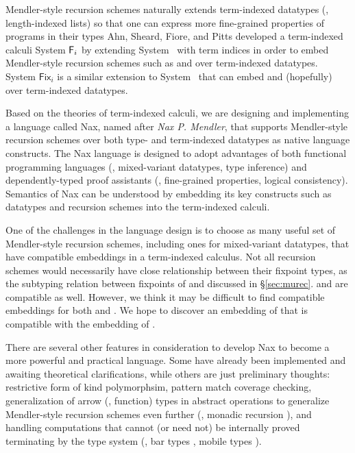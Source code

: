 Mendler-style recursion schemes naturally extends term-indexed datatypes
(\eg, length-indexed lists) so that one can express more fine-grained
properties of programs in their types Ahn, Sheard, Fiore, and Pitts
\cite{AhnSheFioPit13} developed a term-indexed calculi System $\F_i$
by extending System \Fw\ with term indices in order to embed
Mendler-style recursion schemes such as \MIt{} and \msfit{} over
term-indexed datatypes. System $\textsf{Fix}_i$ \cite{Ahn14thesis} is
a similar extension to System \Fixw\ that can embed \mpr{} and
(hopefully) \mphit{} over term-indexed datatypes.

Based on the theories of term-indexed calculi, we are designing and
implementing a language called Nax, named after \emph{Nax P. Mendler},
that supports Mendler-style recursion schemes over
both type- and term-indexed datatypes as native language constructs.
The Nax language \cite{Ahn14thesis} is designed to adopt advantages
of both functional programming languages (\eg, mixed-variant datatypes,
type inference) and dependently-typed proof assistants (\eg,
fine-grained properties, logical consistency). Semantics of Nax can be
understood by embedding its key constructs such as datatypes and
recursion schemes into the term-indexed calculi.

One of the challenges in the language design is to choose as many
useful set of Mendler-style recursion schemes, including ones
for mixed-variant datatypes, that have compatible embeddings
in a term-indexed calculus. Not all recursion schemes would necessarily
have close relationship between their fixpoint types, as the subtyping
relation between fixpoints of \MIt{} and \msfit{} discussed
in \S\ref{sec:murec}. \MIt{} and \mpr{} are compatible as well.
However, we think it may be difficult to find compatible embeddings for
both \mpr{} and \msfit{}. We hope to discover an embedding of \mphit{}
that is compatible with the embedding of \mpr{}.

There are several other features in consideration to develop Nax to
become a more powerful and practical language. Some have already been
implemented and awaiting theoretical clarifications, while others
are just preliminary thoughts:
restrictive form of kind polymorphsim, pattern match coverage checking,
generalization of arrow (\ie, function) types in abstract operations
to generalize Mendler-style recursion schemes even further (\eg,
monadic recursion \cite{bahr11wgp}), and handling computations that
cannot (or need not) be internally proved terminating by the type system
(\eg, bar types \cite{constable1987partial}, mobile types \cite{CasSjoWei14}).
